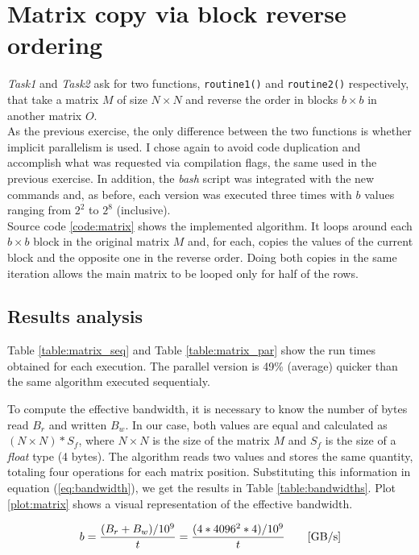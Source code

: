 \section{Matrix copy via block reverse ordering}
\textit{Task1} and \textit{Task2} ask for two functions, \texttt{routine1()} and \texttt{routine2()} respectively, that %
take a matrix $M$ of size $N\times N$ and reverse the order in blocks $b\times b$ in another matrix $O$.\\%
As the previous exercise, the only difference between the two functions is whether implicit parallelism is used. I chose %
again to avoid code duplication and accomplish what was requested via compilation flags, the same used in the previous %
exercise. In addition, the \textit{bash} script was integrated with the new commands and, as before, each version was %
executed three times with $b$ values ranging from $2^2$ to $2^8$ (inclusive).\\%
Source code \ref{code:matrix} shows the implemented algorithm. It loops around each $b\times b$ block in the original %
matrix $M$ and, for each, copies the values of the current block and the opposite one in the reverse order. Doing both %
copies in the same iteration allows the main matrix to be looped only for half of the rows.


\subsection*{Results analysis}
Table \ref{table:matrix_seq} and Table \ref{table:matrix_par} show the run times obtained for each execution. The parallel %
version is 49\% (average) quicker than the same algorithm executed sequentialy.%

\begin{table}[h!tb]
    \centering
    \parbox{.45\linewidth}{
    }
    \parbox{.50\linewidth}{
    }
\end{table}

To compute the effective bandwidth, it is necessary to know the number of bytes read $B_r$ and written $B_w$. In our %
case, both values are equal and calculated as $(N\times N) * S_f$, where $N\times N$ is the size of the matrix $M$ and %
$S_f$ is the size of a \textit{float} type (4 bytes). The algorithm reads two values and stores the same %
quantity, totaling four operations for each matrix position. Substituting this information in equation (\ref{eq:bandwidth}), %
we get the results in Table \ref{table:bandwidths}. Plot \ref{plot:matrix} shows a visual representation of the effective %
bandwidth.

\begin{equation}
    \label{eq:bandwidth}
    b=\frac{(B_r+B_w)/10^9}{t}=\frac{(4*4096^2*4)/10^9}{t}\qquad[\textnormal{GB/s}]
\end{equation}


